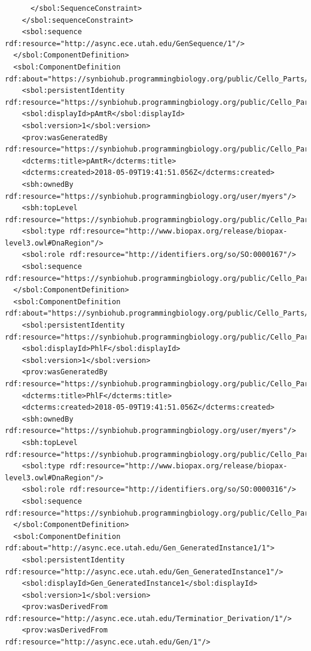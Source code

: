 \begin{lstlisting}
      </sbol:SequenceConstraint>
    </sbol:sequenceConstraint>
    <sbol:sequence rdf:resource="http://async.ece.utah.edu/GenSequence/1"/>
  </sbol:ComponentDefinition>
  <sbol:ComponentDefinition rdf:about="https://synbiohub.programmingbiology.org/public/Cello_Parts/pAmtR/1">
    <sbol:persistentIdentity rdf:resource="https://synbiohub.programmingbiology.org/public/Cello_Parts/pAmtR"/>
    <sbol:displayId>pAmtR</sbol:displayId>
    <sbol:version>1</sbol:version>
    <prov:wasGeneratedBy rdf:resource="https://synbiohub.programmingbiology.org/public/Cello_Parts/CelloUCF2sbol_Activity/1"/>
    <dcterms:title>pAmtR</dcterms:title>
    <dcterms:created>2018-05-09T19:41:51.056Z</dcterms:created>
    <sbh:ownedBy rdf:resource="https://synbiohub.programmingbiology.org/user/myers"/>
    <sbh:topLevel rdf:resource="https://synbiohub.programmingbiology.org/public/Cello_Parts/pAmtR/1"/>
    <sbol:type rdf:resource="http://www.biopax.org/release/biopax-level3.owl#DnaRegion"/>
    <sbol:role rdf:resource="http://identifiers.org/so/SO:0000167"/>
    <sbol:sequence rdf:resource="https://synbiohub.programmingbiology.org/public/Cello_Parts/pAmtR_sequence/1"/>
  </sbol:ComponentDefinition>
  <sbol:ComponentDefinition rdf:about="https://synbiohub.programmingbiology.org/public/Cello_Parts/PhlF/1">
    <sbol:persistentIdentity rdf:resource="https://synbiohub.programmingbiology.org/public/Cello_Parts/PhlF"/>
    <sbol:displayId>PhlF</sbol:displayId>
    <sbol:version>1</sbol:version>
    <prov:wasGeneratedBy rdf:resource="https://synbiohub.programmingbiology.org/public/Cello_Parts/CelloUCF2sbol_Activity/1"/>
    <dcterms:title>PhlF</dcterms:title>
    <dcterms:created>2018-05-09T19:41:51.056Z</dcterms:created>
    <sbh:ownedBy rdf:resource="https://synbiohub.programmingbiology.org/user/myers"/>
    <sbh:topLevel rdf:resource="https://synbiohub.programmingbiology.org/public/Cello_Parts/PhlF/1"/>
    <sbol:type rdf:resource="http://www.biopax.org/release/biopax-level3.owl#DnaRegion"/>
    <sbol:role rdf:resource="http://identifiers.org/so/SO:0000316"/>
    <sbol:sequence rdf:resource="https://synbiohub.programmingbiology.org/public/Cello_Parts/PhlF_sequence/1"/>
  </sbol:ComponentDefinition>
  <sbol:ComponentDefinition rdf:about="http://async.ece.utah.edu/Gen_GeneratedInstance1/1">
    <sbol:persistentIdentity rdf:resource="http://async.ece.utah.edu/Gen_GeneratedInstance1"/>
    <sbol:displayId>Gen_GeneratedInstance1</sbol:displayId>
    <sbol:version>1</sbol:version>
    <prov:wasDerivedFrom rdf:resource="http://async.ece.utah.edu/Terminatior_Derivation/1"/>
    <prov:wasDerivedFrom rdf:resource="http://async.ece.utah.edu/Gen/1"/>

\end{lstlisting}
